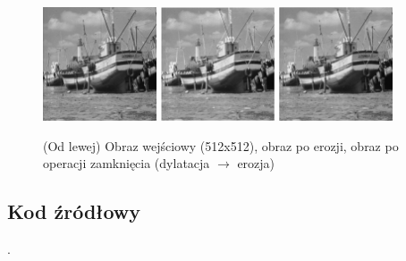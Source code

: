 \documentclass[final,a4paper,openany,12pt]{mwbk}
\begin{document}
\begin{figure}[H]
	\begin{center}
		\includegraphics[width=0.3\textwidth]{2/2Gray_Cl_Original}
		\includegraphics[width=0.3\textwidth]{2/2Gray_Cl_D_Result}
		\includegraphics[width=0.3\textwidth]{2/2Gray_Cl_DE_Result}
	\end{center}
	\caption{(Od lewej) Obraz wejściowy (512x512), obraz po erozji, obraz  po operacji zamknięcia (dylatacja $\rightarrow$ erozja)}
\end{figure}


\subsection*{Kod źródłowy}
.
\end{document}

